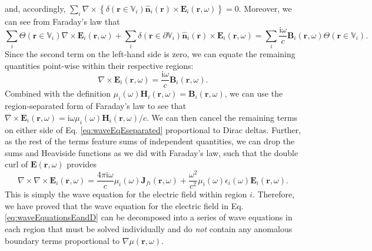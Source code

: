 and, accordingly, $\sum_i\nabla\times\left\{\delta(\mathbf{r}\in\mathbb{V}_i)\hat{\mathbf{n}}_i(\mathbf{r})\times\mathbf{E}_i(\mathbf{r},\omega)\right\} = 0$. Moreover, we can see from Faraday's law that
\begin{equation}
\sum_i\Theta(\mathbf{r}\in\mathbb{V}_i)\nabla\times\mathbf{E}_i(\mathbf{r},\omega) + \sum_i\delta(\mathbf{r}\in\partial\mathbb{V}_i)\hat{\mathbf{n}}_i(\mathbf{r})\times\mathbf{E}_i(\mathbf{r},\omega) = \sum_i\frac{\mathrm{i}\omega}{c}\mathbf{B}_i(\mathbf{r},\omega)\Theta(\mathbf{r}\in\mathbb{V}_i).
\end{equation}
Since the second term on the left-hand side is zero, we can equate the remaining quantities point-wise within their respective regions:
\begin{equation}
\nabla\times\mathbf{E}_i(\mathbf{r},\omega) = \frac{\mathrm{i}\omega}{c}\mathbf{B}_i(\mathbf{r},\omega).
\end{equation}
\sloppy Combined with the definition $\mu_i(\omega)\mathbf{H}_i(\mathbf{r},\omega) = \mathbf{B}_i(\mathbf{r},\omega)$, we can use the region-separated form of Faraday's law to see that $\nabla\times\mathbf{E}_i(\mathbf{r},\omega) = \mathrm{i}\omega\mu_i(\omega)\mathbf{H}_i(\mathbf{r},\omega)/c$. We can then cancel the remaining terms on either side of Eq. \eqref{eq:waveEqEseparated} proportional to Dirac deltas. Further, as the rest of the terms feature sums of independent quantities, we can drop the sums and Heaviside functions as we did with Faraday's law, such that the double curl of $\mathbf{E}(\mathbf{r},\omega)$ provides
\begin{equation}\label{eq:waveEqEseparated2}
\nabla\times\nabla\times\mathbf{E}_i(\mathbf{r},\omega) = \frac{4\pi\mathrm{i}\omega}{c}\mu_i(\omega)\mathbf{J}_{fi}(\mathbf{r},\omega) + \frac{\omega^2}{c^2}\mu_i(\omega)\epsilon_i(\omega)\mathbf{E}_i(\mathbf{r},\omega).
\end{equation}
This is simply the wave equation for the electric field within region $i$. Therefore, we have proved that the wave equation for the electric field in Eq. \eqref{eq:waveEquationsEandD} can be decomposed into a series of wave equations in each region that must be solved individually and do \textit{not} contain any anomalous boundary terms proportional to $\nabla\mu(\mathbf{r},\omega)$.

